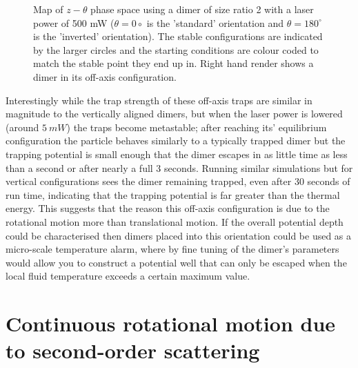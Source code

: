 \begin{figure}[h!]
\begin{subfigure}{0.32\linewidth}
		\caption{}
	\end{subfigure}
	\caption{Map of $z-\theta$ phase space using a dimer of size ratio 2 with 
		a laser power of 500 mW ($\theta=0\circ$ is the 'standard' orientation 
		and $\theta=180^\circ$ is the 'inverted' orientation). The stable 
		configurations are indicated by the larger circles and the starting 
		conditions are colour coded to match the stable point they end up in. 
		Right hand render shows a dimer in its off-axis configuration.}
	\label{fig:off_axis}
\end{figure}

Interestingly while the trap strength of these off-axis traps are similar 
in magnitude to the vertically aligned dimers, but when the laser power 
is lowered (around $5\ mW$) the traps become metastable; after reaching its'
equilibrium configuration the particle behaves similarly to a typically
trapped dimer but the trapping potential is small enough that the dimer
escapes in as little time as less than a second or after nearly a full 
3 seconds. Running similar simulations but for vertical configurations 
sees the dimer remaining trapped, even after 30 seconds of run time, 
indicating that the trapping potential is far greater than the thermal 
energy. This suggests that the reason this off-axis configuration is due 
to the rotational motion more than translational motion. If the overall 
potential depth could be characterised then dimers placed into this 
orientation could be used as a micro-scale temperature alarm, where 
by fine tuning of the dimer's parameters would allow you to construct a 
potential well that can only be escaped when the local fluid temperature 
exceeds a certain maximum value.  

\section{Continuous rotational motion due to second-order scattering}

